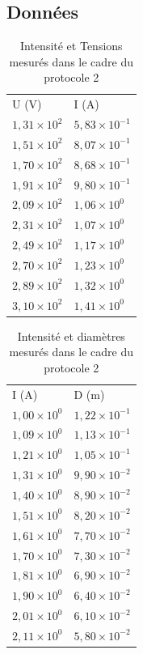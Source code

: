 \documentclass[a4paper,10pt,french]{scrartcl}
\begin{document}
\subsection{Données}
\begin{table}[H]
\begin{center}
\begin{tabular}{ll}
U (V) & I (A) \\
$1,31 \times 10^2$ & $5,83 \times 10^{-1}$ \\
$1,51 \times 10^2$ & $8,07 \times 10^{-1}$ \\
$1,70 \times 10^2$ & $8,68 \times 10^{-1}$ \\
$1,91 \times 10^2$ & $9,80 \times 10^{-1}$ \\
$2,09 \times 10^2$ & $1,06 \times 10^{0}$ \\
$2,31 \times 10^2$ & $1,07 \times 10^{0}$ \\
$2,49 \times 10^2$ & $1,17 \times 10^{0}$ \\
$2,70 \times 10^2$ & $1,23 \times 10^{0}$ \\
$2,89 \times 10^2$ & $1,32 \times 10^{0}$ \\
$3,10 \times 10^2$ & $1,41 \times 10^{0}$
\end{tabular}
\end{center}
\caption{Intensité et Tensions mesurés dans le cadre du protocole 2}
\end{table}

\begin{table}[H]
 \begin{center}
\begin{tabular}{ll}
I (A) & D (m)\\
$1,00 \times 10^0$ & $1,22 \times 10^{-1}$\\
$1,09 \times 10^0$ & $1,13 \times 10^{-1}$\\
$1,21 \times 10^0$ & $1,05 \times 10^{-1}$\\
$1,31 \times 10^0$ & $9,90 \times 10^{-2}$\\
$1,40 \times 10^0$ & $8,90 \times 10^{-2}$\\
$1,51 \times 10^0$ & $8,20 \times 10^{-2}$\\
$1,61 \times 10^0$ & $7,70 \times 10^{-2}$\\
$1,70 \times 10^0$ & $7,30 \times 10^{-2}$\\
$1,81 \times 10^0$ & $6,90 \times 10^{-2}$\\
$1,90 \times 10^0$ & $6,40 \times 10^{-2}$\\
$2,01 \times 10^0$ & $6,10 \times 10^{-2}$\\
$2,11 \times 10^0$ & $5,80 \times 10^{-2}$
\end{tabular}
\end{center}
\caption{Intensité et diamètres mesurés dans le cadre du protocole 2}
\end{table}
\end{document}
